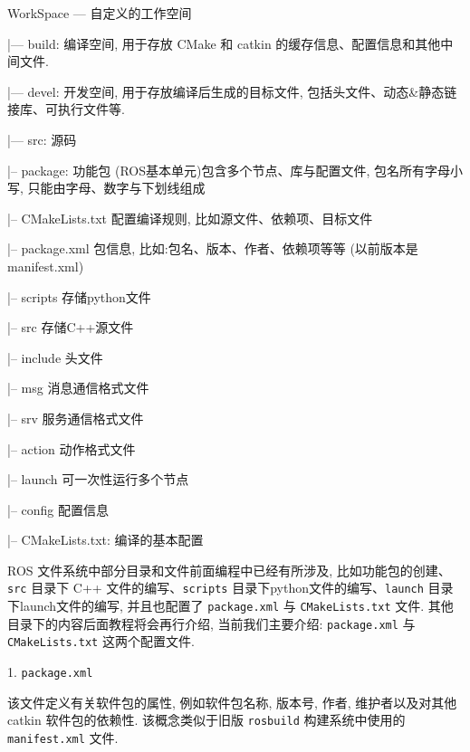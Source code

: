 \documentclass[openany, fontset=windowsold]{ctexbook}
\theoremstyle{kaiti}
\theoremstyle{normal}
\begin{document}
\begin{bash}
  WorkSpace --- 自定义的工作空间

    |--- build: 编译空间, 用于存放 CMake 和 catkin 的缓存信息、配置信息和其他中间文件.

    |--- devel: 开发空间, 用于存放编译后生成的目标文件, 包括头文件、动态&静态链接库、可执行文件等.

    |--- src: 源码

        |-- package: 功能包 (ROS基本单元)包含多个节点、库与配置文件, 包名所有字母小写, 只能由字母、数字与下划线组成

            |-- CMakeLists.txt 配置编译规则, 比如源文件、依赖项、目标文件

            |-- package.xml 包信息, 比如:包名、版本、作者、依赖项等等 (以前版本是 manifest.xml)

            |-- scripts 存储python文件

            |-- src 存储C++源文件

            |-- include 头文件

            |-- msg 消息通信格式文件

            |-- srv 服务通信格式文件

            |-- action 动作格式文件

            |-- launch 可一次性运行多个节点 

            |-- config 配置信息

        |-- CMakeLists.txt: 编译的基本配置
\end{bash}

ROS 文件系统中部分目录和文件前面编程中已经有所涉及, 比如功能包的创建、\verb|src| 目录下 C++ 文件的编写、\verb|scripts| 目录下python文件的编写、\verb|launch| 目录下launch文件的编写, 并且也配置了 \verb|package.xml| 与 \verb|CMakeLists.txt| 文件. 其他目录下的内容后面教程将会再行介绍, 当前我们主要介绍: \verb|package.xml| 与 \verb|CMakeLists.txt| 这两个配置文件.

1. \verb|package.xml|

该文件定义有关软件包的属性, 例如软件包名称, 版本号, 作者, 维护者以及对其他 catkin 软件包的依赖性. 该概念类似于旧版 \verb|rosbuild| 构建系统中使用的 \verb|manifest.xml| 文件.
\end{document}
